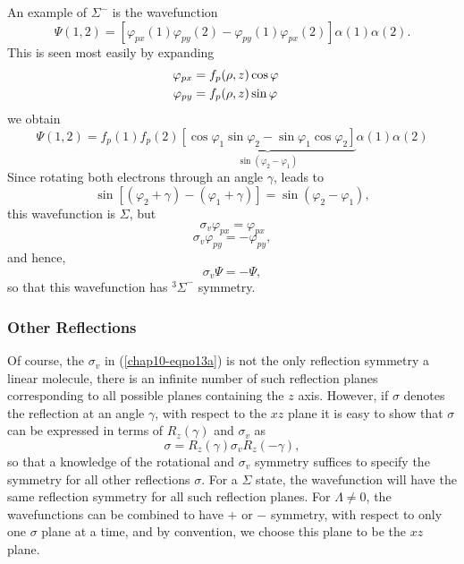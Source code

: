 An example of $\Sigma^-$ is the wavefunction
\begin{equation}
\Psi (1,2) = \left[ \varphi_{px} (1) \varphi_{py} (2) - \varphi_{py} 
(1) \varphi_{px} (2) \right] \alpha (1) \alpha (2).
\end{equation}
This is seen most easily by expanding
\begin{eqnarray}
\varphi_{px} &= f_p ( \rho , z ) \cos \varphi\cr
\varphi_{py} &= f_p ( \rho , z ) \sin \varphi
\end{eqnarray}
we obtain
\begin{equation}
\Psi(1,2) = f_p(1) f_p(2) \underbrace{[\cos \varphi_1 \sin 
\varphi_2 - \sin \varphi_1 \cos \varphi_2]}_{\sin( \varphi_2 - 
\varphi_1 )} \alpha (1) \alpha (2)
\end{equation}
Since rotating both electrons through an angle $\gamma$, leads to
\begin{equation}
\sin \left[ \left( \varphi_2 + \gamma \right) - \left( \varphi_1 + 
\gamma \right) \right] = \sin \left( \varphi_2 - \varphi_1 \right),
\end{equation}
this wavefunction is $\Sigma$, but 
\begin{equation}
\sigma_v \varphi_{px} = \varphi_{px}
\end{equation}
\begin{equation}
\sigma_v \varphi_{py} = - \varphi_{py},
\end{equation}
and hence, 
\begin{equation}
\sigma_v \Psi = - \Psi,
\end{equation}
so that this wavefunction has ${^3\Sigma}^-$ symmetry.

\subsubsection{Other Reflections}

Of course, the $\sigma_v$ in (\ref{chap10-eqno13a}) is not the only reflection symmetry a 
linear molecule, there is an infinite number of such reflection 
planes corresponding to all possible planes containing the $z$ 
axis.  However, if $\sigma$ denotes 
the reflection at an angle $\gamma$, with respect to the $xz$ plane
it is easy to show that $\sigma$ can be expressed in terms of 
$R_z(\gamma)$ and $\sigma_v$ as
\begin{equation}
\sigma = R_z ( \gamma ) \sigma_v R_z (- \gamma ),
\end{equation}
so that a knowledge of the rotational and $\sigma_v$ symmetry
suffices to specify the symmetry for all other reflections $\sigma$.
For a $\Sigma$ state, the wavefunction will have the same reflection
symmetry for all such reflection planes.  For $\Lambda \not= 0$, the
wavefunctions can be combined to have $+$ or $-$ symmetry, with
respect to only one $\sigma$ plane at a time, and by convention, we
choose this plane to be the $xz$ plane.

